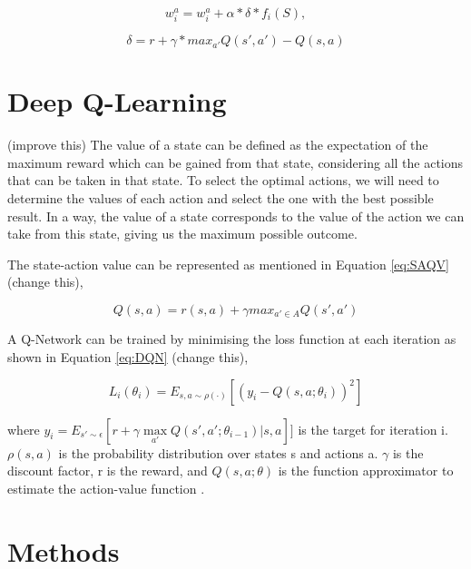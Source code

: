 \documentclass[logo,msc]{infthesis}           %
\begin{document}
\begin{equation}
w_i^a = w_i^a  + {\alpha} * {\delta} * f_i(S),
\label{eq:W_Approx}
\end{equation}

\begin{equation}
{\delta} = r + {\gamma} * max_{a'} Q(s',a') - Q(s,a)
\label{eq:delta}
\end{equation}

\section{Deep Q-Learning}

(improve this) The value of a state can be defined as the expectation of the maximum reward which can be gained from that state, considering all the actions that can be taken in that state. To select the optimal actions, we will need to determine the values of each action and select the one with the best possible result. In a way, the value of a state corresponds to the value of the action we can take from this state, giving us the maximum possible outcome.

 The state-action value can be represented as mentioned in Equation \ref{eq:SAQV} (change this),

\begin{equation}
Q(s,a) = r(s,a) + {\gamma} max_{a'\in A} Q(s',a')
\label{eq:SAQV}
\end{equation}
 
 A Q-Network can be trained by minimising the loss function at each iteration as shown in Equation \ref{eq:DQN} (change this),

\begin{equation} L_{i}(\theta _{i}) = E_{s,a\sim\rho(\cdot)}[(y_{i} - Q(s,a;\theta _{i}))^2]
\label{eq:DQN}
\end{equation}

where \(y_{i} = E_{s'\sim\epsilon}[r+\gamma\max\limits_{{a'}}Q(s', a'; \theta_{i-1})|s, a]]\) is the target for iteration i. \(\rho(s,a)\) is the probability distribution over states s and actions a. \(\gamma\) is the discount factor, r is the reward, and \(Q(s,a;\theta)\) is the function approximator to estimate the action-value function \cite{DBLP:journals/corr/MnihKSGAWR13}.

\section{Methods}
\end{document}

